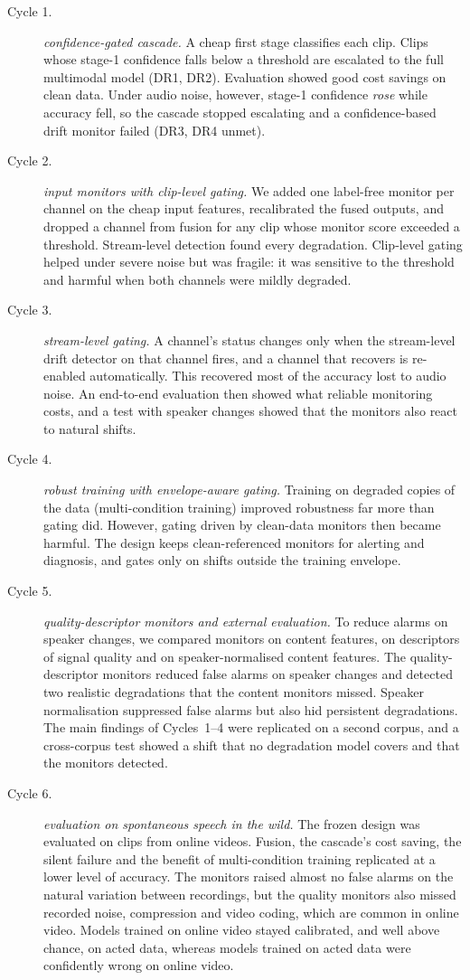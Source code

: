 \begin{description}
\item[Cycle 1.] \emph{confidence-gated cascade.} A cheap first stage classifies each clip. Clips whose stage-1 confidence falls below a threshold are escalated to the full multimodal model (DR1, DR2). Evaluation showed good cost savings on clean data. Under audio noise, however, stage-1 confidence \emph{rose} while accuracy fell, so the cascade stopped escalating and a confidence-based drift monitor failed (DR3, DR4 unmet).
\item[Cycle 2.] \emph{input monitors with clip-level gating.} We added one label-free monitor per channel on the cheap input features, recalibrated the fused outputs, and dropped a channel from fusion for any clip whose monitor score exceeded a threshold. Stream-level detection found every degradation. Clip-level gating helped under severe noise but was fragile: it was sensitive to the threshold and harmful when both channels were mildly degraded.
\item[Cycle 3.] \emph{stream-level gating.} A channel's status changes only when the stream-level drift detector on that channel fires, and a channel that recovers is re-enabled automatically. This recovered most of the accuracy lost to audio noise. An end-to-end evaluation then showed what reliable monitoring costs, and a test with speaker changes showed that the monitors also react to natural shifts.
\item[Cycle 4.] \emph{robust training with envelope-aware gating.} Training on degraded copies of the data (multi-condition training) improved robustness far more than gating did. However, gating driven by clean-data monitors then became harmful. The design keeps clean-referenced monitors for alerting and diagnosis, and gates only on shifts outside the training envelope.
\item[Cycle 5.] \emph{quality-descriptor monitors and external evaluation.} To reduce alarms on speaker changes, we compared monitors on content features, on descriptors of signal quality and on speaker-normalised content features. The quality-descriptor monitors reduced false alarms on speaker changes and detected two realistic degradations that the content monitors missed. Speaker normalisation suppressed false alarms but also hid persistent degradations. The main findings of Cycles~1--4 were replicated on a second corpus, and a cross-corpus test showed a shift that no degradation model covers and that the monitors detected.
\item[Cycle 6.] \emph{evaluation on spontaneous speech in the wild.} The frozen design was evaluated on clips from online videos. Fusion, the cascade's cost saving, the silent failure and the benefit of multi-condition training replicated at a lower level of accuracy. The monitors raised almost no false alarms on the natural variation between recordings, but the quality monitors also missed recorded noise, compression and video coding, which are common in online video. Models trained on online video stayed calibrated, and well above chance, on acted data, whereas models trained on acted data were confidently wrong on online video.
\end{description}
